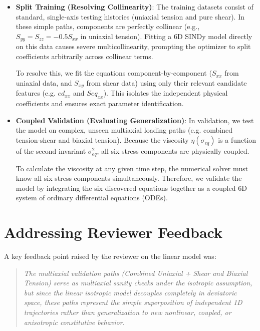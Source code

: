 \documentclass{article}
\begin{document}
\begin{itemize}
    \item \textbf{Split Training (Resolving Collinearity)}: 
    The training datasets consist of standard, single-axis testing histories (uniaxial tension and pure shear). In these simple paths, components are perfectly collinear (e.g., $S_{yy} = S_{zz} = -0.5 S_{xx}$ in uniaxial tension). Fitting a 6D SINDy model directly on this data causes severe multicollinearity, prompting the optimizer to split coefficients arbitrarily across collinear terms. 
    
    To resolve this, we fit the equations component-by-component ($S_{xx}$ from uniaxial data, and $S_{xy}$ from shear data) using only their relevant candidate features (e.g. $ed_{xx}$ and $Seq_{xx}$). This isolates the independent physical coefficients and ensures exact parameter identification.
    
    \item \textbf{Coupled Validation (Evaluating Generalization)}: 
    In validation, we test the model on complex, unseen multiaxial loading paths (e.g. combined tension-shear and biaxial tension). Because the viscosity $\eta(\sigma_{eq})$ is a function of the second invariant $\sigma_{eq}^2$, all six stress components are physically coupled. 
    
    To calculate the viscosity at any given time step, the numerical solver must know all six stress components simultaneously. Therefore, we validate the model by integrating the six discovered equations together as a coupled 6D system of ordinary differential equations (ODEs).
\end{itemize}

\section{Addressing Reviewer Feedback}
A key feedback point raised by the reviewer on the linear model was:
\begin{quote}
    \textit{The multiaxial validation paths (Combined Uniaxial + Shear and Biaxial Tension) serve as multiaxial sanity checks under the isotropic assumption, but since the linear isotropic model decouples completely in deviatoric space, these paths represent the simple superposition of independent 1D trajectories rather than generalization to new nonlinear, coupled, or anisotropic constitutive behavior.}
\end{quote}
\end{document}
